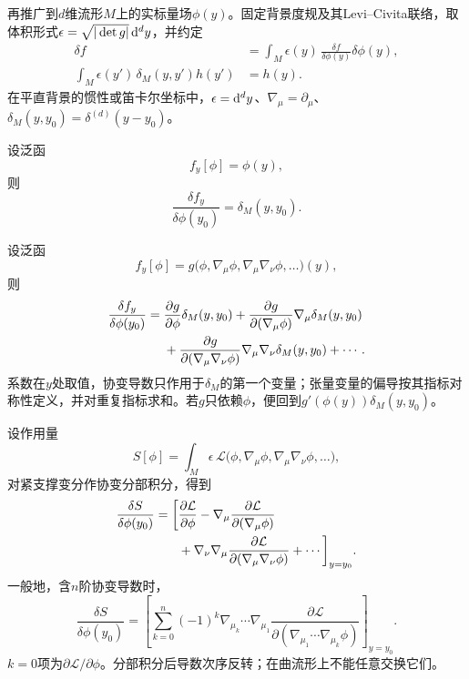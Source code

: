 再推广到$d$维流形$M$上的实标量场$\phi(y)$。固定背景度规及其Levi--Civita联络，取体积形式$\epsilon=\sqrt{|\det g|}\,\mathrm d^dy$，并约定
\begin{align}
    \delta f&=\int_M\epsilon(y)\,\frac{\delta f}{\delta\phi(y)}\delta\phi(y),\\
    \int_M\epsilon(y')\,\delta_M(y,y')h(y')&=h(y).
\end{align}
在平直背景的惯性或笛卡尔坐标中，$\epsilon=\mathrm d^dy$、$\nabla_\mu=\partial_\mu$、$\delta_M(y,y_0)=\delta^{(d)}(y-y_0)$。
\begin{example}
    设泛函
    \begin{equation}
        f_y[\phi]=\phi(y),
    \end{equation}
    则
    \begin{equation}
        \frac{\delta f_y}{\delta\phi(y_0)}=\delta_M(y,y_0).
    \end{equation}
\end{example}
\begin{example}
    设泛函
    \begin{equation}
        f_y[\phi]=g\bigl(\phi,\nabla_\mu\phi,
        \nabla_\mu\nabla_\nu\phi,\ldots\bigr)(y),
    \end{equation}
    则
    \begin{align}
        \frac{\delta f_y}{\delta\phi(y_0)}
        ={}&\frac{\partial g}{\partial\phi}\delta_M(y,y_0)
        +\frac{\partial g}{\partial(\nabla_\mu\phi)}\nabla_\mu\delta_M(y,y_0)\notag\\
        &+\frac{\partial g}{\partial(\nabla_\mu\nabla_\nu\phi)}
        \nabla_\mu\nabla_\nu\delta_M(y,y_0)+\cdots.
    \end{align}
    系数在$y$处取值，协变导数只作用于$\delta_M$的第一个变量；张量变量的偏导按其指标对称性定义，并对重复指标求和。若$g$只依赖$\phi$，便回到$g'(\phi(y))\delta_M(y,y_0)$。
\end{example}
\begin{example}
    设作用量
    \begin{equation}
        S[\phi]=\int_M\epsilon\,
        \mathcal L\bigl(\phi,\nabla_\mu\phi,\nabla_\mu\nabla_\nu\phi,\ldots\bigr),
    \end{equation}
    对紧支撑变分作协变分部积分，得到
    \begin{align}
        \frac{\delta S}{\delta\phi(y_0)}
        =\bigg[&\frac{\partial\mathcal L}{\partial\phi}
        -\nabla_\mu\frac{\partial\mathcal L}{\partial(\nabla_\mu\phi)}\notag\\
        &+\nabla_\nu\nabla_\mu
        \frac{\partial\mathcal L}{\partial(\nabla_\mu\nabla_\nu\phi)}
        +\cdots\bigg]_{y=y_0}.
    \end{align}
    一般地，含$n$阶协变导数时，
    \begin{equation}
        \frac{\delta S}{\delta\phi(y_0)}
        =\left[\sum_{k=0}^n(-1)^k\nabla_{\mu_k}\cdots\nabla_{\mu_1}
        \frac{\partial\mathcal L}
        {\partial(\nabla_{\mu_1}\cdots\nabla_{\mu_k}\phi)}\right]_{y=y_0}.
    \end{equation}
    $k=0$项为$\partial\mathcal L/\partial\phi$。分部积分后导数次序反转；在曲流形上不能任意交换它们。
\end{example}
